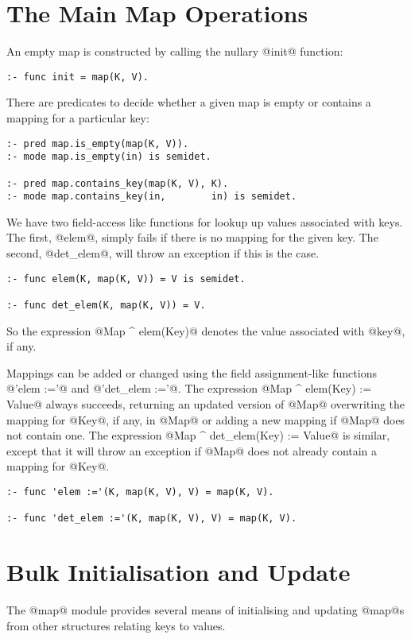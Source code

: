 \section{The Main Map Operations}

An empty map is constructed by calling the nullary @init@ function:
\begin{verbatim}
:- func init = map(K, V).
\end{verbatim}
There are predicates to decide whether a given map is empty or
contains a mapping for a particular key:
\begin{verbatim}
:- pred map.is_empty(map(K, V)).
:- mode map.is_empty(in) is semidet.

:- pred map.contains_key(map(K, V), K).
:- mode map.contains_key(in,        in) is semidet.
\end{verbatim}
We have two field-access like functions for lookup up values
associated with keys.  The first, @elem@, simply fails if there
is no mapping for the given key.  The second, @det_elem@, will
throw an exception if this is the case.
\begin{verbatim}
:- func elem(K, map(K, V)) = V is semidet.

:- func det_elem(K, map(K, V)) = V.
\end{verbatim}
So the expression @Map ^ elem(Key)@ denotes the value associated
with @key@, if any.

Mappings can be added or changed using the field assignment-like
functions @'elem :='@ and @'det_elem :='@.  The expression
@Map ^ elem(Key) := Value@ always succeeds, returning an updated
version of @Map@ overwriting the mapping for @Key@, if any, in @Map@
or adding a new mapping if @Map@ does not contain one.  The expression
@Map ^ det_elem(Key) := Value@ is similar, except that it will throw
an exception if @Map@ does not already contain a mapping for @Key@.
\begin{verbatim}
:- func 'elem :='(K, map(K, V), V) = map(K, V).

:- func 'det_elem :='(K, map(K, V), V) = map(K, V).
\end{verbatim}

\section{Bulk Initialisation and Update}

The @map@ module provides several means of initialising and updating
@map@s from other structures relating keys to values.

